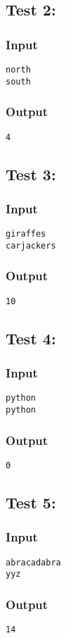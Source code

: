 \documentclass[twocolumn,9pt]{extarticle}
\begin{document}
\subsection*{Test 2:}
\subsubsection*{Input}
\texttt{north\\
south}

\subsubsection*{Output}
\texttt{4}

\subsection*{Test 3:}
\subsubsection*{Input}
\texttt{giraffes\\
carjackers}

\subsubsection*{Output}
\texttt{10}

\subsection*{Test 4:}
\subsubsection*{Input}
\texttt{python\\
python}

\subsubsection*{Output}
\texttt{0}

\subsection*{Test 5:}
\subsubsection*{Input}
\texttt{abracadabra\\
yyz}

\subsubsection*{Output}
\texttt{14}
\end{document}
